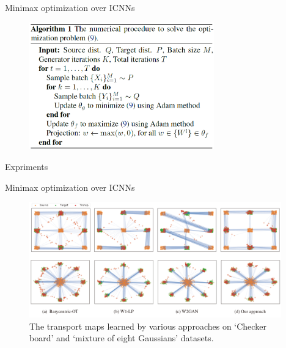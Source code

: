 \documentclass{beamer}		%
\begin{document}
\begin{frame}{Minimax optimization over ICNNs}


\begin{figure}
\includegraphics[height=5.5cm]{figure4.png}
\end{figure}


\end{frame}
    








\begin{frame}[noframenumbering]

\begin{itemize}

    \begin{LARGE}
    
    \item {}
    
    \item {}
    
    \item {}
    
    \item Expriments

    \end{LARGE}
    
\end{itemize}
    
\end{frame}




\begin{frame}{Minimax optimization over ICNNs}
\begin{figure}
\includegraphics[height=5cm]{figure5.png}
\caption{The transport maps learned by various approaches on ‘Checker board’ and ‘mixture of eight Gaussians’ datasets.}
\end{figure}
\end{frame}
\end{document}
